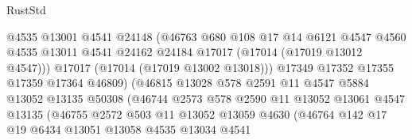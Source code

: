 \begin{lexlean}{RustStd}
\begin{coremodule}
{\begin{coremodule}
{{{{{{{{{{{{{{{{{{{{{{{{{{{{{{{{{{{{{{{{{{{{{{{{{{{{{{{                                  @4535
                                  @13001
                                  @4541
                                  @24148
                                  (@46763
                                    @680
                                    @108
                                    @17
                                    @14
                                    @6121
                                    @4547
                                    @4560
                                    @4535
                                    @13011
                                    @4541
                                    @24162
                                    @24184
                                    @17017
                                    (@17014 (@17019 @13012 @4547)))
                                  @17017
                                  (@17014 (@17019 @13002 @13018)))
                                @17349
                                @17352
                                @17355
                                @17359
                                @17364
                                @46809)
                              (@46815
                                @13028
                                @578
                                @2591
                                @11
                                @4547
                                @5884
                                @13052
                                @13135
                                @50308
                                (@46744
                                  @2573
                                  @578
                                  @2590
                                  @11
                                  @13052
                                  @13061
                                  @4547
                                  @13135
                                  (@46755
                                    @2572
                                    @503
                                    @11
                                    @13052
                                    @13059
                                    @4630
                                    (@46764
                                      @142
                                      @17
                                      @19
                                      @6434
                                      @13051
                                      @13058
                                      @4535
                                      @13034
                                      @4541
}}}}}}}}}}}}}}}}}}}}}}}}}}}}}}}}}}}}}}}}}}}}}}}}}}}}}}}
\end{coremodule}}
\end{coremodule}
\end{lexlean}
